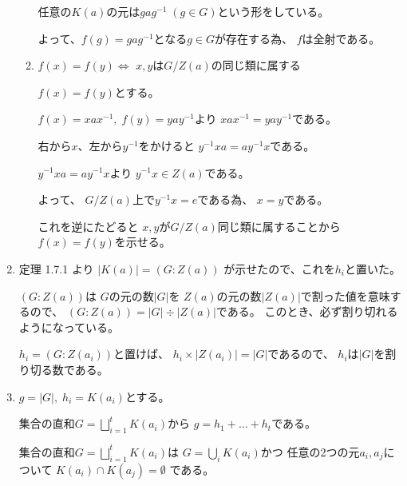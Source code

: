 \documentclass[12pt,b5paper]{ltjsarticle}
\begin{document}
\begin{enumerate}
\begin{enumerate}
              \dotfill

              任意の$K(a)$の元は$gag^{-1} \; (g\in G)$という形をしている。

              よって、$f(g)=gag^{-1}$となる$g\in G$が存在する為、
              $f$は全射である。

              \hrulefill

        \item $f(x)=f(y) \Leftrightarrow$ $x,y$は$G/Z(a)$の同じ類に属する
              \label{cll}
              \dotfill


              $f(x)=f(y)$とする。

              $f(x) = xax^{-1}, \; f(y)=yay^{-1}$より
              $xax^{-1}=yay^{-1}$である。

              右から$x$、左から$y^{-1}$をかけると
              $y^{-1}xa = ay^{-1}x$である。

              $y^{-1}xa = ay^{-1}x$より
              $y^{-1}x \in Z(a)$である。

              よって、
              $G/Z(a)$上で$y^{-1}x = e$である為、
              $x=y$である。

              これを逆にたどると
              $x,y$が$G/Z(a)$同じ類に属することから$f(x)=f(y)$を示せる。


              \hrulefill

       \end{enumerate}

 \item
      定理 1.7.1 より $|K(a)| = (G:Z(a))$ が示せたので、これを$h_{i}$と置いた。
      

      $(G:Z(a))$は $G$の元の数$|G|$を
      $Z(a)$の元の数$|Z(a)|$で割った値を意味するので、
      $(G:Z(a)) = |G| \div |Z(a)|$である。
      このとき、必ず割り切れるようになっている。

      $h_{i}=(G:Z(a_{i}))$と置けば、
      $h_{i}\times |Z(a_{i})| = |G|$であるので、
      $h_{i}$は$|G|$を割り切る数である。

      \hrulefill

 \item $g=|G|,\; h_{i}=K(a_{i})$とする。

       集合の直和$G = \bigsqcup_{i=1}^{t} K(a_{i})$から
       $g=h_{1}+\dots + h_{t}$である。

       \dotfill

       集合の直和$G = \bigsqcup_{i=1}^{t} K(a_{i})$は
       $G = \bigcup_{i} K(a_{i})$かつ
       任意の2つの元$a_{i},a_{j}$について
       $K(a_{i}) \cap K(a_{j}) = \emptyset$
       である。


\end{enumerate}
\end{document}
